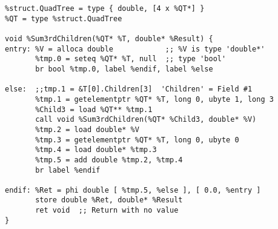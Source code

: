 \begin{verbatim}
%struct.QuadTree = type { double, [4 x %QT*] }
%QT = type %struct.QuadTree

void %Sum3rdChildren(%QT* %T, double* %Result) {
entry: %V = alloca double            ;; %V is type 'double*'
       %tmp.0 = seteq %QT* %T, null  ;; type 'bool'
       br bool %tmp.0, label %endif, label %else

else:  ;;tmp.1 = &T[0].Children[3]  'Children' = Field #1
       %tmp.1 = getelementptr %QT* %T, long 0, ubyte 1, long 3
       %Child3 = load %QT** %tmp.1
       call void %Sum3rdChildren(%QT* %Child3, double* %V)
       %tmp.2 = load double* %V
       %tmp.3 = getelementptr %QT* %T, long 0, ubyte 0
       %tmp.4 = load double* %tmp.3
       %tmp.5 = add double %tmp.2, %tmp.4
       br label %endif

endif: %Ret = phi double [ %tmp.5, %else ], [ 0.0, %entry ]
       store double %Ret, double* %Result
       ret void  ;; Return with no value
}
\end{verbatim}
